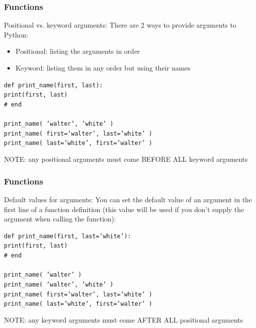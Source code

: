 \documentclass{beamer}
\newcommand{\code}[1]{\texttt{#1}}
\newcommand{\tab}{\hspace*{22pt}}
\begin{document}
\begin{frame}%
	\frametitle{Functions}
	
	\begin{block}{Positional vs. keyword arguments:}
		There are 2 ways to provide arguments to Python:
		\begin{itemize}
			\item Positional: listing the arguments in order
				\item Keyword: listing them in any order but using their names
		\end{itemize}
		
		\vspace{10pt}		
		\code{def print\_name(first, last): \\
				\tab print(first, last) \\
				\# end \\
				\tab \\
				print\_name( 'walter', 'white' ) \\
				print\_name( first='walter', last='white' ) \\
				print\_name( last='white', first='walter' )
		}
		\vspace{10pt}		
		
		NOTE: any positional arguments must come BEFORE ALL keyword arguments
	\end{block}
	
\end{frame}

\begin{frame}%
	\frametitle{Functions}
	
	\begin{block}{Default values for arguments:}
		You can set the default value of an argument in the first line of a function definition (this value will be used if you don't supply the argument when calling the function):
		
		\vspace{10pt}	
		\code{def print\_name(first, last='white'): \\
				\tab print(first, last) \\
				\# end \\
				\tab \\
				print\_name( 'walter' ) \\
				print\_name( 'walter', 'white' ) \\
				print\_name( first='walter', last='white' ) \\
				print\_name( last='white', first='walter' )
		}
		\vspace{10pt}		
		
		NOTE: any keyword arguments must come AFTER ALL positional arguments
	\end{block}
	
\end{frame}
\end{document}
